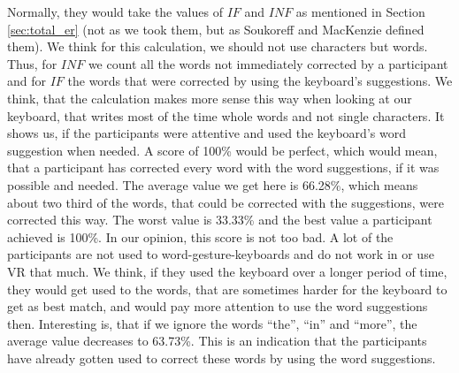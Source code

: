 Normally, they would take the values of $IF$ and $INF$ as mentioned in Section \ref{sec:total_er} (not as we took them, but as Soukoreff and MacKenzie \cite{10.1145/642611.642632} defined them). We think for this calculation, we should not use characters but words. Thus, for $INF$ we count all the words not immediately corrected by a participant and for $IF$ the words that were corrected by using the keyboard's suggestions. We think, that the calculation makes more sense this way when looking at our keyboard, that writes most of the time whole words and not single characters. It shows us, if the participants were attentive and used the keyboard's word suggestion when needed. A score of 100\% would be perfect, which would mean, that a participant has corrected every word with the word suggestions, if it was possible and needed. The average value we get here is 66.28\%, which means about two third of the words, that could be corrected with the suggestions, were corrected this way. The worst value is 33.33\% and the best value a participant achieved is 100\%. In our opinion, this score is not too bad. A lot of the participants are not used to word-gesture-keyboards and do not work in or use VR that much. We think, if they used the keyboard over a longer period of time, they would get used to the words, that are sometimes harder for the keyboard to get as best match, and would pay more attention to use the word suggestions then. Interesting is, that if we ignore the words ``the'', ``in'' and ``more'', the average value decreases to 63.73\%. This is an indication that the participants have already gotten used to correct these words by using the word suggestions.

